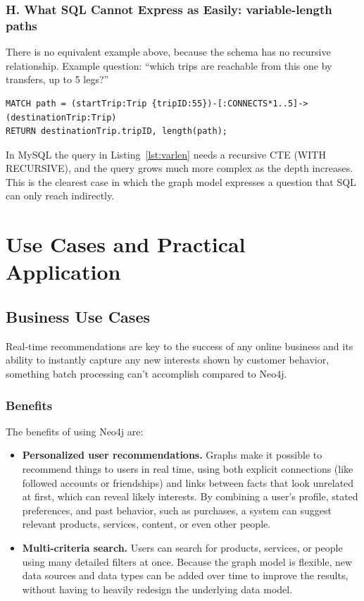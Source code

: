 \documentclass[10pt,a4paper,twocolumn]{article}
\begin{document}
\subsubsection*{H. What SQL Cannot Express as Easily: variable-length paths}

There is no equivalent example above, because the schema has no recursive relationship. Example question: ``which trips are reachable from this one by transfers, up to 5 legs?''

\begin{lstlisting}[style=cyphercode,caption={A variable-length path in Cypher, which SQL expresses with a recursive CTE},label={lst:varlen}]
MATCH path = (startTrip:Trip {tripID:55})-[:CONNECTS*1..5]->(destinationTrip:Trip)
RETURN destinationTrip.tripID, length(path);
\end{lstlisting}

In MySQL the query in Listing~\ref{lst:varlen} needs a recursive CTE (WITH RECURSIVE), and the query grows much more complex as the depth increases. This is the clearest case in which the graph model expresses a question that SQL can only reach indirectly.

\section{Use Cases and Practical Application}

\subsection{Business Use Cases}

Real-time recommendations are key to the success of any online business and its ability to instantly capture any new interests shown by customer behavior, something batch processing can't accomplish compared to Neo4j.

\subsubsection*{Benefits}

The benefits of using Neo4j are:

\begin{itemize}
  \item \textbf{Personalized user recommendations.} Graphs make it possible to recommend things to users in real time, using both explicit connections (like followed accounts or friendships) and links between facts that look unrelated at first, which can reveal likely interests. By combining a user's profile, stated preferences, and past behavior, such as purchases, a system can suggest relevant products, services, content, or even other people.
  \item \textbf{Multi-criteria search.} Users can search for products, services, or people using many detailed filters at once. Because the graph model is flexible, new data sources and data types can be added over time to improve the results, without having to heavily redesign the underlying data model.
\end{itemize}
\end{document}
